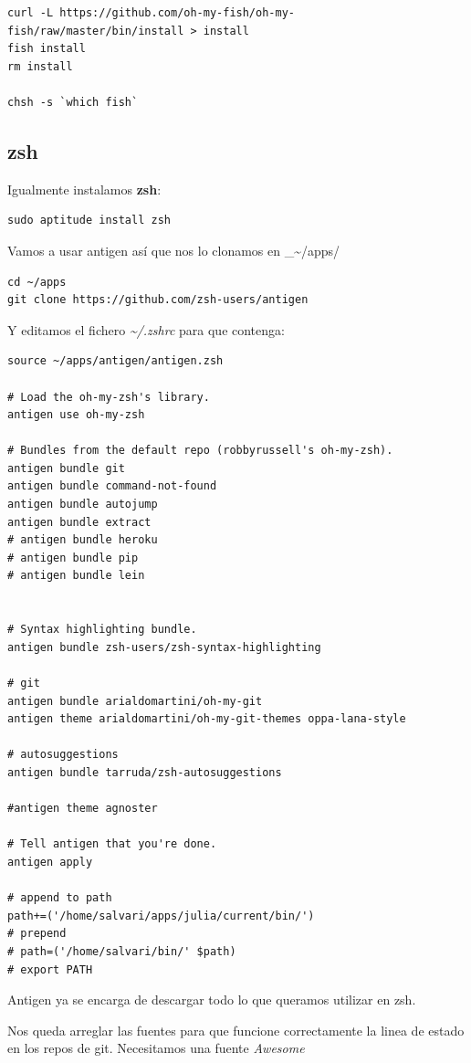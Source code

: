 \documentclass[12pt,spanish,]{article}
\begin{document}
\begin{verbatim}
curl -L https://github.com/oh-my-fish/oh-my-fish/raw/master/bin/install > install
fish install
rm install

chsh -s `which fish`
\end{verbatim}

\subsection{zsh}\label{zsh}

Igualmente instalamos \textbf{zsh}:

\begin{verbatim}
sudo aptitude install zsh
\end{verbatim}

Vamos a usar antigen así que nos lo clonamos en
\_\textasciitilde{}/apps/

\begin{verbatim}
cd ~/apps
git clone https://github.com/zsh-users/antigen
\end{verbatim}

Y editamos el fichero \emph{\textasciitilde{}/.zshrc} para que contenga:

\begin{verbatim}
source ~/apps/antigen/antigen.zsh

# Load the oh-my-zsh's library.
antigen use oh-my-zsh

# Bundles from the default repo (robbyrussell's oh-my-zsh).
antigen bundle git
antigen bundle command-not-found
antigen bundle autojump
antigen bundle extract
# antigen bundle heroku
# antigen bundle pip
# antigen bundle lein


# Syntax highlighting bundle.
antigen bundle zsh-users/zsh-syntax-highlighting

# git
antigen bundle arialdomartini/oh-my-git
antigen theme arialdomartini/oh-my-git-themes oppa-lana-style

# autosuggestions
antigen bundle tarruda/zsh-autosuggestions

#antigen theme agnoster

# Tell antigen that you're done.
antigen apply

# append to path
path+=('/home/salvari/apps/julia/current/bin/')
# prepend
# path=('/home/salvari/bin/' $path)
# export PATH
\end{verbatim}

Antigen ya se encarga de descargar todo lo que queramos utilizar en zsh.

Nos queda arreglar las fuentes para que funcione correctamente la linea
de estado en los repos de git. Necesitamos una fuente \emph{Awesome}
\end{document}
